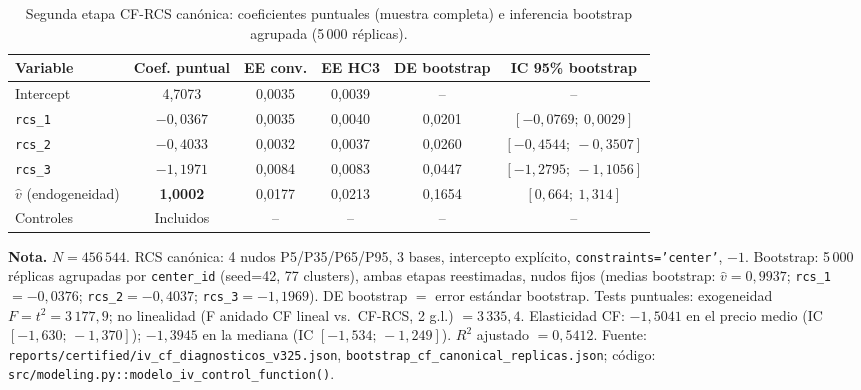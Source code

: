 \documentclass[doc, a4paper, biblatex, floatsintext, longtable, babel]{apa7}
\begin{document}
\begin{table}[!htbp]
\centering
\caption{Segunda etapa CF-RCS canónica: coeficientes puntuales (muestra completa) e inferencia bootstrap agrupada (5\,000 réplicas).}
\label{tab:cf_second_stage_canonical}
\footnotesize
\begin{threeparttable}
\begin{tabular}{lccccc}
\toprule
Variable & Coef. puntual & EE conv. & EE HC3 & DE bootstrap & IC 95\% bootstrap \\
\midrule
Intercept & 4,7073 & 0,0035 & 0,0039 & -- & -- \\
\texttt{rcs\_1} & $-0,0367$ & 0,0035 & 0,0040 & 0,0201 & $[-0,0769;\ 0,0029]$ \\
\texttt{rcs\_2} & $-0,4033$ & 0,0032 & 0,0037 & 0,0260 & $[-0,4544;\ -0,3507]$ \\
\texttt{rcs\_3} & $-1,1971$ & 0,0084 & 0,0083 & 0,0447 & $[-1,2795;\ -1,1056]$ \\
$\hat{v}$ (endogeneidad) & \textbf{1,0002} & 0,0177 & 0,0213 & 0,1654 & $[0,664;\ 1,314]$ \\
Controles & Incluidos & -- & -- & -- & -- \\
\bottomrule
\end{tabular}
\begin{tablenotes}
\footnotesize
\item \textbf{Nota.} $N = 456\,544$. RCS canónica: 4 nudos P5/P35/P65/P95, 3 bases, intercepto explícito, \texttt{constraints='center'}, $-1$. Bootstrap: 5\,000 réplicas agrupadas por \texttt{center\_id} (seed=42, 77 clusters), ambas etapas reestimadas, nudos fijos (medias bootstrap: $\hat{v}=0,9937$; \texttt{rcs\_1}$=-0,0376$; \texttt{rcs\_2}$=-0,4037$; \texttt{rcs\_3}$=-1,1969$). DE bootstrap $=$ error estándar bootstrap. Tests puntuales: exogeneidad $F=t^2=3\,177,9$; no linealidad (F anidado CF lineal vs.\ CF-RCS, 2 g.l.) $=3\,335,4$. Elasticidad CF: $-1,5041$ en el precio medio (IC $[-1,630;\,-1,370]$); $-1,3945$ en la mediana (IC $[-1,534;\,-1,249]$). $R^2$ ajustado $=0,5412$. Fuente: \texttt{reports/certified/iv\_cf\_diagnosticos\_v325.json}, \texttt{bootstrap\_cf\_canonical\_replicas.json}; código: \texttt{src/modeling.py::modelo\_iv\_control\_function()}.
\end{tablenotes}
\end{threeparttable}
\end{table}
\end{document}
